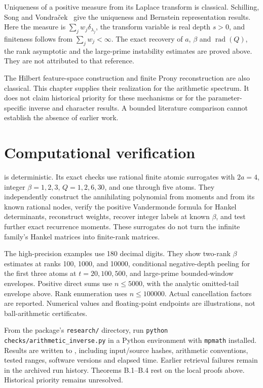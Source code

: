 Uniqueness of a positive measure from its Laplace transform is classical.
Schilling, Song and Vondraček~\cite[Proposition~1.2 and Theorem~1.4]{Schilling2010}
give the uniqueness and Bernstein representation results. Here the measure is
$\sum_jw_j\delta_{\lambda_j}$, the transform variable is real depth $s>0$,
and finiteness follows from $\sum_jw_j<\infty$.
The exact recovery of $a$, $\beta$ and $\operatorname{rad}(Q)$, the rank
asymptotic and the large-prime instability estimates are proved above.
They are not attributed to that reference.

The Hilbert feature-space construction and finite Prony reconstruction are
also classical. This chapter supplies their realization for the arithmetic
spectrum. It does not claim historical priority for these mechanisms or for
the parameter-specific inverse and character results. A bounded literature
comparison cannot establish the absence of earlier work.

\hypertarget{computation-contract-and-handoff}{%
\section{Computational verification}\label{computation-contract-and-handoff}}

 is deterministic. Its exact
checks use rational finite atomic surrogates with \(2a=4\), integer
\(\beta=1,2,3\), \(Q=1,2,6,30\), and one through five atoms. They
independently construct the annihilating polynomial from moments and
from its known rational nodes, verify the positive Vandermonde formula
for Hankel determinants, reconstruct weights, recover integer labels at
known \(\beta\), and test further exact recurrence moments. These
surrogates do not turn the infinite family's Hankel matrices into
finite-rank matrices.

The high-precision examples use 180 decimal digits. They show two-rank
\(\beta\) estimates at ranks 100, 1000, and 10000, conditional
negative-depth peeling for the first three atoms at \(t=20,100,500\),
and large-prime bounded-window envelopes. Positive direct sums use
\(n\le5000\), with the analytic omitted-tail envelope above. Rank
enumeration uses \(n\le100000\). Actual cancellation factors are
reported. Numerical values and floating-point endpoints are
illustrations, not ball-arithmetic certificates.

From the package's \texttt{research/} directory, run
\texttt{\small python checks/arithmetic\_inverse.py} in a Python environment
with \texttt{mpmath} installed. Results are written to
, including
input/source hashes, arithmetic conventions, tested ranges, software
versions and elapsed time. Earlier retrieval failures remain in the archived
run history. Theorems B.1--B.4 rest on the local proofs above. Historical
priority remains unresolved.
